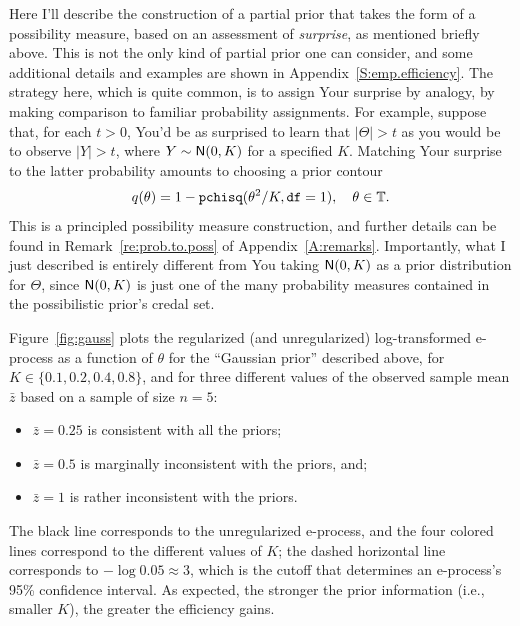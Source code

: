\documentclass[a4paper, 12pt]{article}
\theoremstyle{plain}
\theoremstyle{definition}
\theoremstyle{remark}
\newcommand{\prob}{\mathsf{P}}
\newcommand{\nm}{{\sf N}}
\newcommand{\TT}{\mathbb{T}}
\begin{document}
Here I'll describe the construction of a partial prior that takes the form of a possibility measure, based on an assessment of {\em surprise}, as mentioned briefly above.  This is not the only kind of partial prior one can consider, and some additional details and examples are shown in Appendix~\ref{S:emp.efficiency}.  The strategy here, which is quite common, is to assign Your surprise by analogy, by making comparison to familiar probability assignments.  For example, suppose that, for each $t > 0$, You'd be as surprised to learn that $|\Theta| > t$ as you would be to observe $|Y| > t$, where $Y \sim \nm(0,K)$ for a specified $K$.  Matching Your surprise to the latter probability amounts to choosing a prior contour 
\[ q(\theta) %
= 1 - {\tt pchisq}(\theta^2 / K, {\tt df}=1), \quad \theta \in \TT. \]
This is a principled possibility measure construction, and further details can be found in Remark~\ref{re:prob.to.poss} of Appendix~\ref{A:remarks}. 
Importantly, what I just described is entirely different from You taking $\nm(0,K)$ as a prior distribution for $\Theta$, since $\nm(0,K)$ is just one of the many probability measures contained in the possibilistic prior's credal set. 


Figure~\ref{fig:gauss} plots the regularized (and unregularized) log-transformed e-process as a function of $\theta$ for the ``Gaussian prior'' described above, for $K \in \{0.1, 0.2, 0.4, 0.8\}$, and for three different values of the observed sample mean $\bar z$ based on a sample of size $n=5$:
\begin{itemize}
\item $\bar z=0.25$ is consistent with all the priors;
\vspace{-2mm}
\item $\bar z=0.5$ is marginally inconsistent with the priors, and;
\vspace{-2mm}
\item $\bar z=1$ is rather inconsistent with the priors.
\end{itemize}
The black line corresponds to the unregularized e-process, and the four colored lines correspond to the different values of $K$; the dashed horizontal line corresponds to $-\log0.05 \approx 3$, which is the cutoff that determines an e-process's 95\% confidence interval.  As expected, the stronger the prior information (i.e., smaller $K$), the greater the efficiency gains.   
\end{document}
